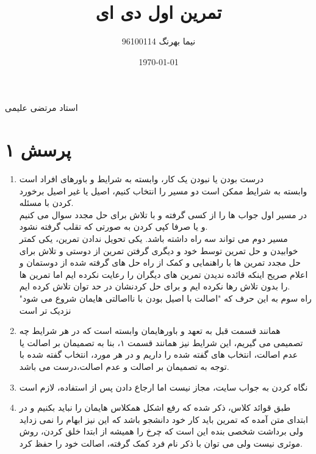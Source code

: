 \documentclass[a4paper]{article}
\title{تمرین اول دی ای}
\author{نیما بهرنگ 96100114}
\date{\today}
\begin{document}
\maketitle
\begin{center}
استاد مرتضی علیمی
\end{center}

\section*{پرسش ۱}
\begin{enumerate}

\item{}
درست بودن یا نبودن یک کار، وابسته به شرایط و باورهای افراد است\\

وابسته به شرایط ممکن است دو مسیر را انتخاب کنیم، اصیل
 یا غیر اصیل برخورد کردن با مسئله.\\
 
 در مسیر اول جواب ها را از کسی گرفته و با تلاش برای حل مجدد سوال می کنیم و یا صرفا کپی کردن به صورتی که تقلب گرفته نشود.\\
 
 مسیر دوم می تواند سه راه داشته باشد. یکی تحویل ندادن تمرین، یکی کمتر خوابیدن و حل تمرین توسط خود و دیگری گرفتن تمرین از دوستی و تلاش برای حل مجدد تمرین ها با راهنمایی و کمک از راه حل های گرفته شده از دوستمان و اعلام صریح اینکه قائده ندیدن تمرین های دیگران را رعایت نکرده ایم اما تمرین ها را بدون تلاش رها نکرده ایم و برای حل کردنشان در حد توان تلاش کرده ایم.\\
 راه سوم به این حرف که "اصالت با اصیل بودن با نااصالتی هایمان شروع می شود" نزدیک تر است\\
 
 \item{}
همانند قسمت قبل به تعهد و باورهایمان وابسته است که در هر شرایط چه تصمیمی می گیریم، این شرایط نیز همانند قسمت ۱، بنا به تصمیمان بر اصالت یا عدم اصالت، انتخاب های گفته شده را داریم و در هر مورد، انتخاب گفته شده با توجه به تصمیمان بر اصالت و عدم اصالت،درست می باشد.
 
\item{}
نگاه کردن به جواب سایت، مجاز نیست اما ارجاع دادن پس از استفاده، لازم است\\

\item{}
طبق قوائد کلاس، ذکر شده که رفع اشکل همکلاس هایمان را نباید بکنیم و در ابتدای متن آمده که تمرین باید کار خود دانشجو باشد که این نیز ابهام را نمی زداید ولی برداشت شخصی بنده این است که چرخ را همیشه از ابتدا خلق کردن، روش موثری نیست ولی می توان با ذکر نام فرد کمک گرفته، اصالت خود را حفظ کرد.\\

 \end{enumerate}
\pagebreak
\end{document}
